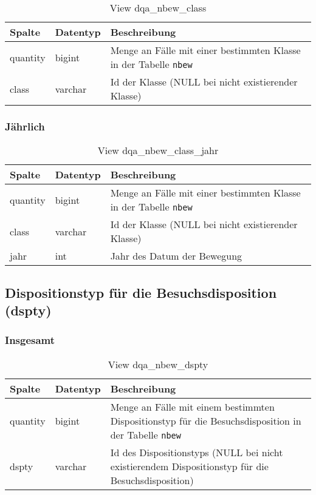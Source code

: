 \begin{table}[ht]
	\centering   
	\caption{View dqa\_nbew\_class}
	\label{tab:bewClassI}
	\begin{tabular}{||l|l|p{10cm}||}   		
		\hline
		Spalte & Datentyp & Beschreibung \\ [0.5ex]
		\hline\hline
		quantity & bigint & Menge an Fälle mit einer bestimmten Klasse in der Tabelle \texttt{nbew} \\
		\hline
		class & varchar & Id der Klasse (NULL bei nicht existierender Klasse)\\
		\hline
		
	\end{tabular}
\end{table}

\subsubsection{Jährlich} \label{subsubsec:bewClassJ}

\begin{table}[ht]
	\centering   
	\caption{View dqa\_nbew\_class\_jahr}
	\label{tab:bewClassJ}
	\begin{tabular}{||l|l|p{10cm}||}   		
		\hline
		Spalte & Datentyp & Beschreibung \\ [0.5ex]
		\hline\hline
		quantity & bigint & Menge an Fälle mit einer bestimmten Klasse in der Tabelle \texttt{nbew}\\
		\hline
		class & varchar & Id der Klasse (NULL bei nicht existierender Klasse)\\
		\hline
		jahr & int &  Jahr des Datum der Bewegung \\
		\hline		
	\end{tabular}
\end{table}

\newpage

\subsection{Dispositionstyp für die Besuchsdisposition (dspty)} \label{subsec:bewdspty}

\subsubsection{Insgesamt} \label{subsubsec:bewDsptyI}

\begin{table}[ht]
	\centering   
	\caption{View dqa\_nbew\_dspty}
	\label{tab:bewDsptyI}
	\begin{tabular}{||l|l|p{10cm}||}   		
		\hline
		Spalte & Datentyp & Beschreibung \\ [0.5ex]
		\hline\hline
		quantity & bigint & Menge an Fälle mit einem bestimmten Dispositionstyp für die Besuchsdisposition in der Tabelle \texttt{nbew} \\
		\hline
		dspty & varchar & Id des Dispositionstyps (NULL bei nicht existierendem Dispositionstyp für die Besuchsdisposition)\\
		\hline
		
	\end{tabular}
\end{table}

